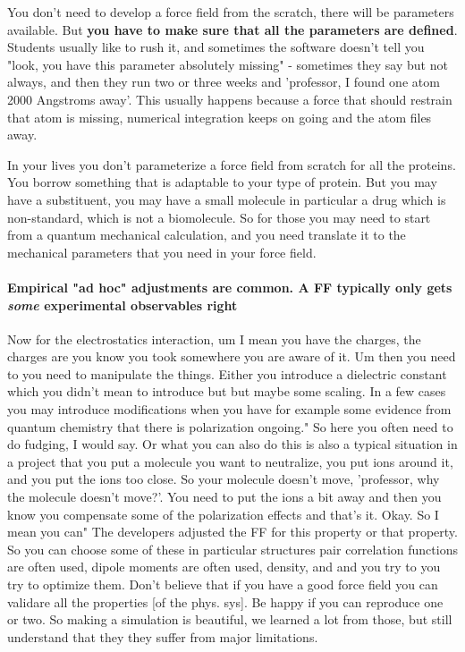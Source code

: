 You don't need to develop a force field from the scratch, there will be parameters available. But \textbf{you have to make sure that all the parameters are defined}. Students usually like to rush it, and sometimes
the software doesn't tell you "look, you have this parameter absolutely missing" - sometimes they say but not always, and then they run two or three weeks and 'professor, I found one atom 2000 Angstroms away'. This usually happens because a force that should restrain that atom is missing, numerical integration keeps on going and the
atom files away.

In your lives you don't parameterize a force field from scratch for all the proteins. You borrow something that is adaptable to your type of protein.
But you may have a substituent, you may have a small molecule in particular a drug which is non-standard, which is not a biomolecule. So for those you may need to start from a quantum mechanical calculation, and you need translate it to the mechanical parameters that you need in your force field.

\paragraph{Empirical "ad hoc" adjustments are common. A FF typically only gets \textit{some} experimental observables right}
Now for the electrostatics interaction, um I mean you have the charges, the charges are you know you took somewhere you are aware of it. Um then you need to you need to manipulate the things. Either you introduce a dielectric constant which you didn't mean to introduce but but maybe some scaling. In a few cases you may introduce modifications when you have for example some evidence from quantum chemistry that there is polarization ongoing."
So here you often need to do fudging, I would say. Or what you can also do this is also a typical situation in a project that you put a molecule you want to neutralize, you put ions around it, and you put the ions too close. So your molecule doesn't move, 'professor, why the molecule doesn't move?'. You need to put the ions a bit away and then you know you compensate some of the polarization effects and that's it. Okay. So I mean you can"
The developers adjusted the FF for this property or that property. So you can choose some of these in particular structures pair correlation functions are often used, dipole moments are often used, density, and and you try to you try to optimize them. Don't believe that if you have a good force field you can validare all the properties [of the phys. sys]. Be happy if you can reproduce one or two.
So making a simulation is beautiful, we learned a lot from those, but still understand that they they suffer from major limitations. 


